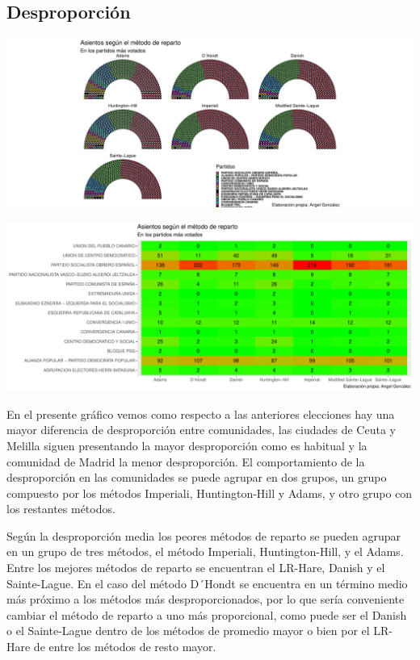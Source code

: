 \documentclass[12pt,a4paper,]{book}
\numberwithin{dummy}{section}
\theoremstyle{ocrenumbox}
\theoremstyle{blacknumex}
\theoremstyle{blacknumbox}
\theoremstyle{ocrenum}
\theoremstyle{ocrenum}
\begin{document}
\hypertarget{desproporciuxf3n-1}{%
\subsection{Desproporción}\label{desproporciuxf3n-1}}

\begin{center}\includegraphics[width=1\linewidth]{figurasR/unnamed-chunk-80-1} \end{center}

\begin{center}\includegraphics[width=1\linewidth]{figurasR/unnamed-chunk-80-2} \end{center}

En el presente gráfico vemos como respecto a las anteriores elecciones
hay una mayor diferencia de desproporción entre comunidades, las
ciudades de Ceuta y Melilla siguen presentando la mayor desproporción
como es habitual y la comunidad de Madrid la menor desproporción. El
comportamiento de la desproporción en las comunidades se puede agrupar
en dos grupos, un grupo compuesto por los métodos Imperiali,
Huntington-Hill y Adams, y otro grupo con los restantes métodos.

Según la desproporción media los peores métodos de reparto se pueden
agrupar en un grupo de tres métodos, el método Imperiali,
Huntington-Hill, y el Adams. Entre los mejores métodos de reparto se
encuentran el LR-Hare, Danish y el Sainte-Lague. En el caso del método
D´Hondt se encuentra en un término medio más próximo a los métodos más
desproporcionados, por lo que sería conveniente cambiar el método de
reparto a uno más proporcional, como puede ser el Danish o el
Sainte-Lague dentro de los métodos de promedio mayor o bien por el
LR-Hare de entre los métodos de resto mayor.
\end{document}
